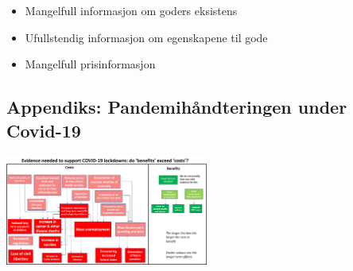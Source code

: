 \documentclass[
  letterpaper,
  DIV=11,
  numbers=noendperiod]{scrartcl}
\providecommand{\tightlist}{%
  \setlength{\itemsep}{0pt}\setlength{\parskip}{0pt}}\usepackage{longtable,booktabs,array}
\begin{document}
\begin{itemize}
\tightlist
\item
  Mangelfull informasjon om goders eksistens
\item
  Ufullstendig informasjon om egenskapene til gode
\item
  Mangelfull prisinformasjon
\end{itemize}

\subsection{Appendiks: Pandemihåndteringen under
Covid-19}\label{appendiks-pandemihuxe5ndteringen-under-covid-19}

\includegraphics[width=0.5\textwidth,height=\textheight]{drawio/cost_ben.jpeg}
\end{document}
